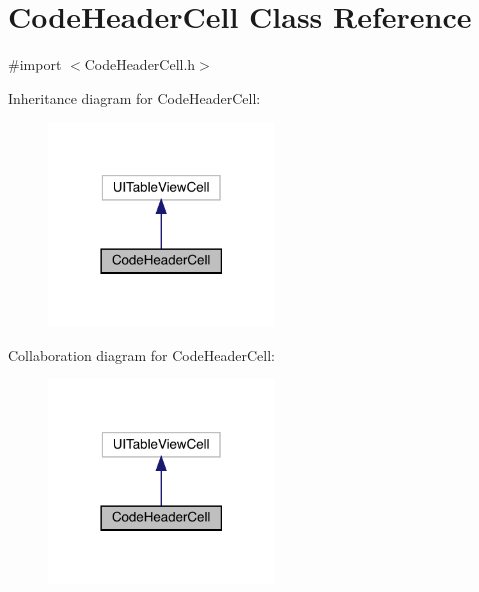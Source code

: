 \hypertarget{interface_code_header_cell}{}\section{Code\+Header\+Cell Class Reference}
\label{interface_code_header_cell}


{\ttfamily \#import $<$Code\+Header\+Cell.\+h$>$}



Inheritance diagram for Code\+Header\+Cell\+:\nopagebreak
\begin{figure}[H]
\begin{center}
\leavevmode
\includegraphics[width=170pt]{interface_code_header_cell__inherit__graph}
\end{center}
\end{figure}


Collaboration diagram for Code\+Header\+Cell\+:\nopagebreak
\begin{figure}[H]
\begin{center}
\leavevmode
\includegraphics[width=170pt]{interface_code_header_cell__coll__graph}
\end{center}
\end{figure}
